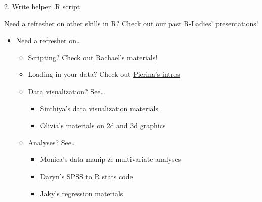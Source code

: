 \documentclass[
  ignorenonframetext,
]{beamer}
\providecommand{\tightlist}{%
  \setlength{\itemsep}{0pt}\setlength{\parskip}{0pt}}
\begin{document}
\begin{frame}[fragile]{2. Write helper .R script}
\begin{block}{Need a refresher on other skills in R? \textbar{} Check
out our past R-Ladies' presentations!}

\begin{itemize}
\tightlist
\item
  Need a refresher on\ldots{}

  \begin{itemize}
  \tightlist
  \item
    Scripting? Check out
    \href{https://www.meetup.com/rladies-ldnont/messages/boards/thread/51239206}{Rachael's
    materials!}
  \item
    Loading in your data? Check out
    \href{https://www.meetup.com/rladies-ldnont/messages/boards/thread/51164998}{Pierina's
    intros}
  \item
    Data visualization? See\ldots{}

    \begin{itemize}
    \tightlist
    \item
      \href{https://www.meetup.com/rladies-ldnont/messages/boards/thread/50724440}{Sinthiya's
      data visualization materials}
    \item
      \href{https://www.meetup.com/rladies-ldnont/messages/boards/thread/50864967}{Olivia's
      materials on 2d and 3d graphics}
    \end{itemize}
  \item
    Analyses? See\ldots{}

    \begin{itemize}
    \tightlist
    \item
      \href{https://www.meetup.com/rladies-ldnont/messages/boards/thread/50910795}{Monica's
      data manip \& multivariate analyses}
    \item
      \href{https://drive.google.com/drive/folders/0BznwYF956_rDRUtoS3N4dldySmc?usp=sharing}{Daryn's
      SPSS to R stats code}
    \item
      \href{https://www.meetup.com/rladies-ldnont/messages/boards/thread/51292341}{Jaky's
      regression materials}
    \end{itemize}
  \end{itemize}
\end{itemize}

\end{block}

\end{frame}
\end{document}
